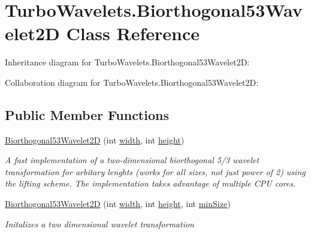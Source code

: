 \hypertarget{class_turbo_wavelets_1_1_biorthogonal53_wavelet2_d}{\section{Turbo\+Wavelets.\+Biorthogonal53\+Wavelet2\+D Class Reference}
\label{class_turbo_wavelets_1_1_biorthogonal53_wavelet2_d}
}


Inheritance diagram for Turbo\+Wavelets.\+Biorthogonal53\+Wavelet2\+D\+:


Collaboration diagram for Turbo\+Wavelets.\+Biorthogonal53\+Wavelet2\+D\+:
\subsection*{Public Member Functions}
\begin{DoxyCompactItemize}
\item 
\hyperlink{class_turbo_wavelets_1_1_biorthogonal53_wavelet2_d_a8783eb5b8e032cd8cf75c5a1bb80bba0}{Biorthogonal53\+Wavelet2\+D} (int \hyperlink{class_turbo_wavelets_1_1_wavelet2_d_aaa4b3711957fe1798980e6891331a08d}{width}, int \hyperlink{class_turbo_wavelets_1_1_wavelet2_d_afb2aa87b89b82f329357cbdc0cde18a8}{height})
\begin{DoxyCompactList}\small\item\em A fast implementation of a two-\/dimensional biorthogonal 5/3 wavelet transformation for arbitary lenghts (works for all sizes, not just power of 2) using the lifting scheme. The implementation takes advantage of multiple C\+P\+U cores. \end{DoxyCompactList}\item 
\hyperlink{class_turbo_wavelets_1_1_biorthogonal53_wavelet2_d_a2d9bf97c2211d5859b3a53835bea7888}{Biorthogonal53\+Wavelet2\+D} (int \hyperlink{class_turbo_wavelets_1_1_wavelet2_d_aaa4b3711957fe1798980e6891331a08d}{width}, int \hyperlink{class_turbo_wavelets_1_1_wavelet2_d_afb2aa87b89b82f329357cbdc0cde18a8}{height}, int \hyperlink{class_turbo_wavelets_1_1_wavelet2_d_af5148ef1a46dd5694ccea13aa8f1b9e2}{min\+Size})
\begin{DoxyCompactList}\small\item\em Initalizes a two dimensional wavelet transformation \end{DoxyCompactList}\end{DoxyCompactItemize}
